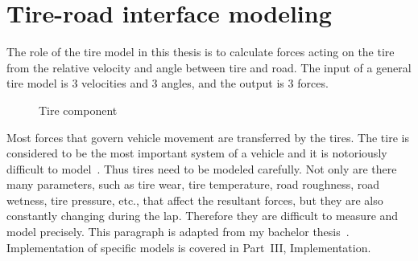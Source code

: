 \section{Tire-road interface modeling}
The role of the tire model in this thesis is to calculate forces acting on the tire from the relative velocity and angle between tire and road. The input of a general tire model is 3 velocities and 3 angles, and the output is 3 forces.\label{tiremodel}


\begin{figure}[H]
	\centering
	\caption{Tire component}\label{fig:tire}
\end{figure}


Most forces that govern vehicle movement are transferred by the tires. The tire is considered to be the most important system of a vehicle and it is notoriously difficult to model~\cite{Yuki-2019}. Thus tires need to be modeled carefully. Not only are there many parameters, such as tire wear, tire temperature, road roughness, road wetness, tire pressure, etc., that affect the resultant forces, but they are also constantly changing during the lap. Therefore they are difficult to measure and model precisely. This paragraph is adapted from my bachelor thesis~\cite{ciglanskyAnalysisVehicleComponents}.
Implementation of specific models is covered in Part~III, Implementation.



